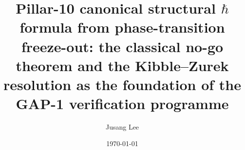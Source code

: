 



\title{Pillar-10 canonical structural $\hbar$ formula from
phase-transition freeze-out: the classical no-go theorem and the
Kibble--Zurek resolution as the foundation of the GAP-1 verification
programme}

\author{Jusang Lee}

\date{\today}

